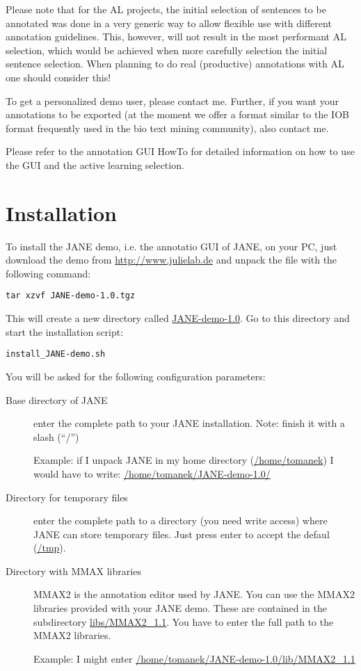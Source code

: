 \documentclass[DIV12,english,11pt,halfparskip]{scrartcl}
\begin{document}
Please note that for the AL projects, the initial selection of
sentences to be annotated was done in a very generic way to allow
flexible use with different annotation guidelines. This, however, will
not result in the most performant AL selection, which would be
achieved when more carefully selection the initial sentence selection.
When planning to do real (productive) annotations with AL one should
consider this!

To get a personalized demo user, please contact me. Further, if you
want your annotations to be exported (at the moment we offer a format
similar to the IOB format frequently used in the bio text mining
community), also contact me.

Please refer to the annotation GUI HowTo for detailed information on
how to use the GUI and the active learning selection.


\section{Installation}
\label{sec:installation}
To install the JANE demo, i.e. the annotatio GUI of JANE, on your PC,
just download the demo from \url{http://www.julielab.de} and unpack
the file with the following command:
\begin{verbatim}
tar xzvf JANE-demo-1.0.tgz
\end{verbatim}

This will create a new directory called \url{JANE-demo-1.0}. Go to
this directory and start the installation script:
\begin{verbatim}
install_JANE-demo.sh
\end{verbatim}

You will be asked for the following configuration parameters:

\begin{description}
\item [Base directory of JANE] enter the complete path to your JANE
  installation. Note: finish it with a slash (``/'')

  Example: if I unpack JANE in my home directory (\url{/home/tomanek})
  I would have to write: \url{/home/tomanek/JANE-demo-1.0/}

\item[Directory for temporary files] enter the complete path to a
  directory (you need write access) where JANE can store
  temporary files. Just press enter to accept the defaul (\url{/tmp}).

\item[Directory with MMAX libraries] MMAX2 is the annotation editor
  used by JANE. You can use the MMAX2 libraries provided with your JANE
  demo. These are contained in the subdirectory \url{libs/MMAX2_1.1}.
  You have to enter the full path to the MMAX2 libraries.

  Example: I might enter
  \url{/home/tomanek/JANE-demo-1.0/lib/MMAX2_1.1}

\end{description}
\end{document}
